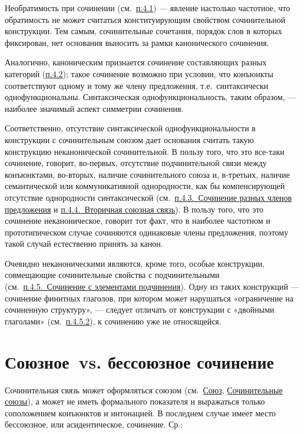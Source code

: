 Необратимость при сочинении (см.~\underline{п.4.1}) --- явление настолько
частотное, что обратимость не может считаться конституирующим свойством
сочинительной конструкции. Тем самым, сочинительные сочетания, порядок
слов в которых фиксирован, нет основания выносить за рамки канонического
сочинения.

Аналогично, каноническим признается сочинение составляющих разных
категорий (\underline{п.4.2}); такое сочинение возможно при условии, что
конъюнкты соответствуют одному и тому же члену предложения,
т.е.~синтаксически однофункциональны. Синтаксическая
однофункциональность, таким образом, --- наиболее значимый аспект
симметрии сочинения.

Соответственно, отсутствие синтаксической однофункциональности в
конструкции с сочинительным союзом дает основания считать такую
конструкцию неканонической сочинительной. В пользу того, что это
все-таки сочинение, говорит, во-первых, отсутствие подчинительной связи
между конъюнктами, во-вторых, наличие сочинительного союза и, в-третьих,
наличие семантической или коммуникативной однородности, как бы
компенсирующей отсутствие однородности синтаксической
(см.~\underline{п.4.3.~Сочинение разных членов предложения} и
\underline{п.4.4.~Вторичная союзная связь}). В пользу того, что это
сочинение неканоническое, говорит тот факт, что в наиболее частотном и
прототипическом случае сочиняются одинаковые члены предложения, поэтому
такой случай естественно принять за канон.

Очевидно неканоническими являются, кроме того, особые конструкции,
совмещающие сочинительные свойства с подчинительными
(см.~\underline{п.4.5.~Сочинение с элементами подчинения}). Одну из
таких конструкций --- сочинение финитных глаголов, при котором может
нарушаться «ограничение на сочиненную структуру», --- следует отличать от
конструкции с «двойными глаголами» (см.~\underline{п.4.5.2}), к
сочинению уже не относящейся.

\section{Союзное~vs. бессоюзное
  сочинение}\label{ux441ux43eux44eux437ux43dux43eux435-vs.-ux431ux435ux441ux441ux43eux44eux437ux43dux43eux435-ux441ux43eux447ux438ux43dux435ux43dux438ux435}

Сочинительная связь может оформляться союзом (см.~\underline{Союз},
\underline{Сочинительные союзы}), а может не иметь формального
показателя и выражаться только соположением конъюнктов и интонацией. В
последнем случае имеет место бессоюзное, или асидентическое, сочинение.
Ср.:

